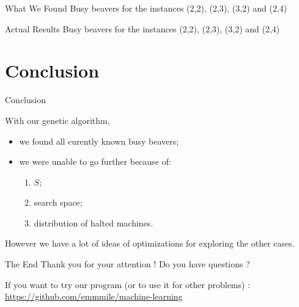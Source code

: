 \documentclass{beamer}
\begin{document}
\begin{frame}{What We Found}
Busy beavers for the instances (2,2), (2,3), (3,2) and (2,4)
\end{frame}

\begin{frame}{Actual Results}
Busy beavers for the instances (2,2), (2,3), (3,2) and (2,4)
\end{frame}

\section{Conclusion}

\begin{frame}{Conclusion}

With our genetic algorithm,
  \begin{itemize}
  \item we found all curently known busy beavers;
  \item we were unable to go further because of:
    \begin{enumerate}
    \item $S$;
    \item search space;
    \item distribution of halted machines.
    \end{enumerate}
  \end{itemize}

\vspace{1cm} %
However we have a lot of ideas of optimizations for exploring the other cases.
\end{frame}

\begin{frame}{The End}
  Thank you for your attention !
Do you have questions ?

\vspace{2cm} %

If you want to try our program (or to use it for other problems) :
\url{https://github.com/emmmile/machine-learning}
\end{frame}
\end{document}
